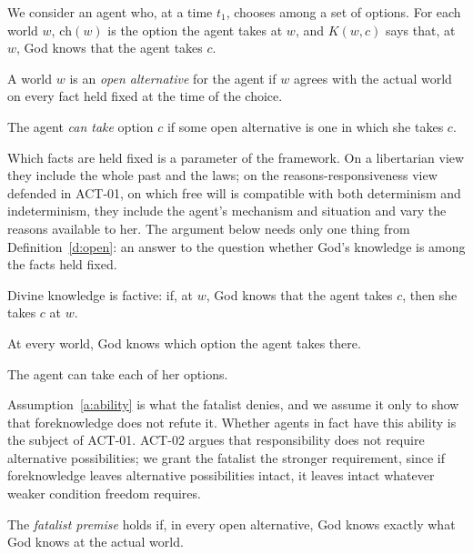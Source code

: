 \documentclass{situationist-preprint}
\begin{document}
We consider an agent who, at a time $t_1$, chooses among a set of options. For each world $w$, $\mathrm{ch}(w)$ is the option the agent takes at $w$, and $K(w, c)$ says that, at $w$, God knows that the agent takes $c$.

\begin{definition}\label{d:open}
A world $w$ is an \emph{open alternative} for the agent if $w$ agrees with the actual world on every fact held fixed at the time of the choice.
\end{definition}

\begin{definition}\label{d:can}
The agent \emph{can take} option $c$ if some open alternative is one in which she takes $c$.
\end{definition}

Which facts are held fixed is a parameter of the framework. On a libertarian view they include the whole past and the laws; on the reasons-responsiveness view defended in ACT-01, on which free will is compatible with both determinism and indeterminism, they include the agent's mechanism and situation and vary the reasons available to her. The argument below needs only one thing from Definition~\ref{d:open}: an answer to the question whether God's knowledge is among the facts held fixed.

\begin{assumption}\label{a:factive}
Divine knowledge is factive: if, at $w$, God knows that the agent takes $c$, then she takes $c$ at $w$.
\end{assumption}

\begin{assumption}\label{a:omni}
At every world, God knows which option the agent takes there.
\end{assumption}

\begin{assumption}\label{a:ability}
The agent can take each of her options.
\end{assumption}

Assumption~\ref{a:ability} is what the fatalist denies, and we assume it only to show that foreknowledge does not refute it. Whether agents in fact have this ability is the subject of ACT-01. ACT-02 argues that responsibility does not require alternative possibilities; we grant the fatalist the stronger requirement, since if foreknowledge leaves alternative possibilities intact, it leaves intact whatever weaker condition freedom requires.

\begin{definition}\label{d:fatalist}
The \emph{fatalist premise} holds if, in every open alternative, God knows exactly what God knows at the actual world.
\end{definition}
\end{document}
